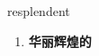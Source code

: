 
\begin{frame}
{\huge resplendent}
\begin{center}
\begin{enumerate}\Large
  \item \textbf{华丽辉煌的}
\end{enumerate}
\end{center}
\end{frame}
